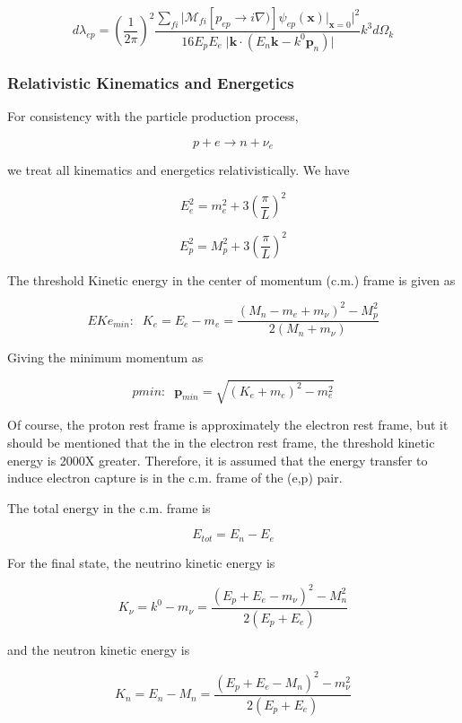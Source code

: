 \documentclass[11pt]{amsart}
\begin{document}
$$d\lambda_{ep}=\left(\dfrac{1}{2\pi}\right)^{2}\dfrac{\sum_{fi}\big\vert\mathcal{M}_{fi}\left[p_{ep}\rightarrow i\nabla)\right]\psi_{ep}(\mathbf{x})\big\vert_{\mathbf{x}=0}\big\vert^{2}}{16E_{p}E_{e}\;\big\vert\mathbf{k}\cdot(E{_n}\mathbf{k}-k^{0}\mathbf{p}_{n})\big\vert}k^{3}d\Omega_{k}$$


\subsubsection{Relativistic Kinematics and Energetics}
For consistency with the particle production process,

$$ p+e\rightarrow n+\nu_{e} $$

we treat all kinematics and energetics relativistically.  We have

$$E^{2}_{e}=m^{2}_{e}+3\left(\dfrac{\pi}{L}\right)^{2}$$ 

$$E^{2}_{p}=M^{2}_{p}+3\left(\dfrac{\pi}{L}\right)^{2}$$

The threshold Kinetic energy in the center of momentum (c.m.) frame is given as

$$EKe_{min}:\;\;K_{e}=E_{e}-m_{e}=\dfrac{(M_{n}-m_{e}+m_{\nu})^{2}-M^{2}_{p}}{2(M_{n}+m_{\nu})}$$
 
Giving the minimum momentum as

$$pmin:\;\;\mathbf{p}_{min}=\sqrt{(K_{e}+m_{e})^{2}-m_{e}^{2}} $$

Of course, the proton rest frame is approximately the electron rest frame, but it should be mentioned that the in the electron rest frame, the threshold kinetic energy is 2000X greater.  Therefore, it is assumed that the energy transfer to induce electron capture is in the c.m. frame of the (e,p) pair.

The total energy in the c.m. frame is

$$E_{tot}=E_{n}-E_{e}$$

For the final state, the neutrino kinetic energy is

$$K_{\nu}=k^{0}-m_{\nu}=\dfrac{(E_{p}+E_{e}-m_{\nu})^{2}-M^{2}_{n}}{2(E_{p}+E_{e})}$$

and the neutron kinetic energy is

$$K_{n}=E_{n}-M_{n}=\dfrac{(E_{p}+E_{e}-M_{n})^{2}-m^{2}_{\nu}}{2(E_{p}+E_{e})}$$
\end{document}
